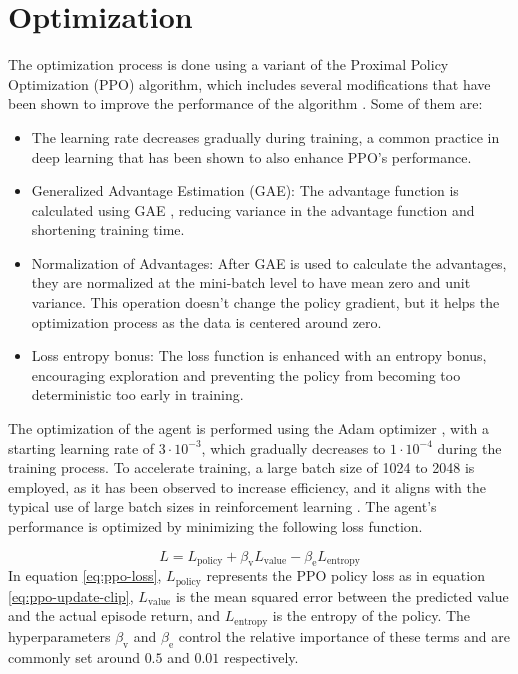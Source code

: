 \section{Optimization}
The optimization process is done using a variant of the Proximal Policy Optimization (PPO) algorithm, which includes several modifications that have been shown to improve the performance of the algorithm \cite{ppo-implementation-details}. Some of them are:
\begin{itemize}
    \item The learning rate decreases gradually during training, a common practice in deep learning that has been shown to also enhance PPO's performance.
    \item Generalized Advantage Estimation (GAE): The advantage function is calculated using GAE \cite{schulman2015high}, reducing variance in the advantage function and shortening training time.
    \item Normalization of Advantages: After GAE is used to calculate the advantages, they are normalized at the mini-batch level to have mean zero and unit variance. This operation doesn't change the policy gradient, but it helps the optimization process as the data is centered around zero.
    \item Loss entropy bonus: The loss function is enhanced with an entropy bonus, encouraging exploration and preventing the policy from becoming too deterministic too early in training.
\end{itemize}

The optimization of the agent is performed using the Adam optimizer \cite{kingma2014adam}, with a starting learning rate of $3 \cdot 10^{-3}$, which gradually decreases to $1 \cdot 10^{-4}$ during the training process. To accelerate training, a large batch size of 1024 to 2048 is employed, as it has been observed to increase efficiency, and it aligns with the typical use of large batch sizes in reinforcement learning \cite{mccandlish2018empirical}. The agent's performance is optimized by minimizing the following loss function.

\begin{equation}
    L = L_{\textrm{policy}} + \beta_\textrm{v} L_\textrm{value} - \beta_\textrm{e} L_\textrm{entropy}
    \label{eq:ppo-loss}
\end{equation}
In equation \eqref{eq:ppo-loss}, $L_{\textrm{policy}}$ represents the PPO policy loss as in equation \eqref{eq:ppo-update-clip}, $L_\textrm{value}$ is the mean squared error between the predicted value and the actual episode return, and $L_\textrm{entropy}$ is the entropy of the policy. The hyperparameters $\beta_\textrm{v}$ and $\beta_\textrm{e}$ control the relative importance of these terms and are commonly set around $0.5$ and $0.01$ respectively.


